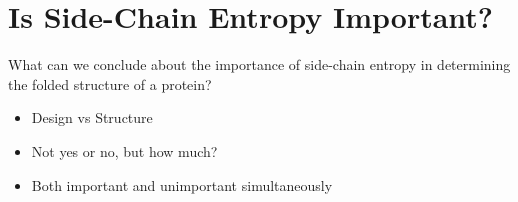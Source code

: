 \section*{Is Side-Chain Entropy Important?}
\label{sec:is_side_chain_entropy_important_}
What can we conclude about the importance of side-chain entropy in determining the folded structure of a protein?
\begin{itemize}
	\item Design vs Structure
	\item Not yes or no, but how much?
	\item Both important and unimportant simultaneously
\end{itemize}